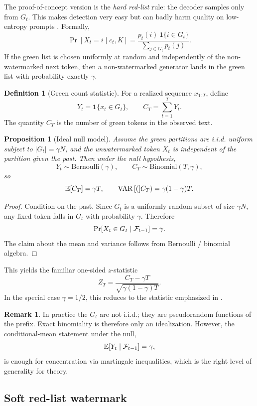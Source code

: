 \documentclass[11pt]{article}
\newtheorem{proposition}[theorem]{Proposition}
\theoremstyle{definition}
\newtheorem{definition}[theorem]{Definition}
\newtheorem{remark}[theorem]{Remark}
\newcommand{\E}{\mathbb{E}}
\newcommand{\1}{\mathbf{1}}
\begin{document}
The proof-of-concept version is the \emph{hard red-list} rule: the decoder samples only from $G_t$. This makes detection very easy but can badly harm quality on low-entropy prompts \cite{kirchenbauer2023watermark}. Formally,
\[
\Pr[X_t = i \mid c_t, K] = \frac{p_t(i)\,\1\{i\in G_t\}}{\sum_{j\in G_t} p_t(j)}.
\]
If the green list is chosen uniformly at random and independently of the non-watermarked next token, then a non-watermarked generator lands in the green list with probability exactly $\gamma$.

\begin{definition}[Green count statistic]
For a realized sequence $x_{1:T}$, define
\[
Y_t = \1\{x_t \in G_t\}, \qquad C_T = \sum_{t=1}^T Y_t.
\]
The quantity $C_T$ is the number of green tokens in the observed text.
\end{definition}

\begin{proposition}[Ideal null model]
Assume the green partitions are i.i.d. uniform subject to $|G_t|=\gamma N$, and the unwatermarked token $X_t$ is independent of the partition given the past. Then under the null hypothesis,
\[
Y_t \sim \mathrm{Bernoulli}(\gamma), \qquad C_T \sim \mathrm{Binomial}(T,\gamma),
\]
so
\[
\E[C_T]=\gamma T,\qquad \Var(C_T)=\gamma(1-\gamma)T.
\]
\end{proposition}

\begin{proof}
Condition on the past. Since $G_t$ is a uniformly random subset of size $\gamma N$, any fixed token falls in $G_t$ with probability $\gamma$. Therefore
\[
\Pr[X_t \in G_t \mid {\cal F}_{t-1}] = \gamma.
\]
The claim about the mean and variance follows from Bernoulli / binomial algebra.
\end{proof}

This yields the familiar one-sided $z$-statistic
\[
Z_T = \frac{C_T-\gamma T}{\sqrt{\gamma(1-\gamma)T}}.
\]
In the special case $\gamma = 1/2$, this reduces to the statistic emphasized in \cite{kirchenbauer2023watermark}.

\begin{remark}
In practice the $G_t$ are not i.i.d.; they are pseudorandom functions of the prefix. Exact binomiality is therefore only an idealization. However, the conditional-mean statement under the null,
\[
\E[Y_t\mid \cF_{t-1}] = \gamma,
\]
is enough for concentration via martingale inequalities, which is the right level of generality for theory.
\end{remark}

\subsection{Soft red-list watermark}
\end{document}
